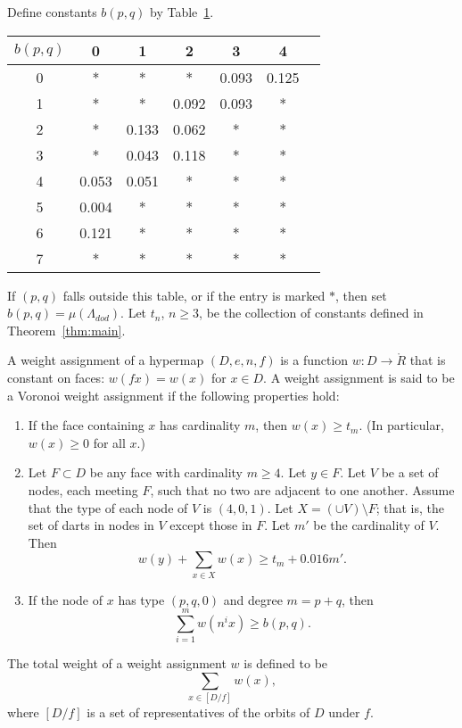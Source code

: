 \documentclass{article} %
\begin{document}
Define constants $b(p,q)$ by Table~\ref{vertexTable}.
\begin{centering}
\begin{table}
\label{vertexTable}
\begin{tabular}{|c|c|c|c|c|c|c|} 
\hline
$b(p,q)$ & 0 & 1 & 2 & 3 & 4 \\
\hline
0 & * & * & * & 0.093 & 0.125  \\
1 & * & * & 0.092 & 0.093 & *  \\
2 & * & 0.133 & 0.062 & * & *  \\
3 & * & 0.043 & 0.118 & * & *  \\
4 & 0.053 & 0.051 & * & * & *  \\
5 & 0.004 & * & * & * & *  \\
6 & 0.121 & * & * & * & * \\
7 & * & * & * & * & * \\
\hline
\end{tabular}
\end{table}
\end{centering}
If $(p,q)$ falls outside this table, or if the entry is marked $*$, then
set $b(p,q)=\mu(\Lambda_{dod})$.
Let $t_n$, $n\ge3$, be the collection of constants defined in Theorem~\ref{thm:main}.

A weight assignment of a hypermap $(D,e,n,f)$ is a function $w:D \to \ring{R}$ that
is constant on faces: $w(f x) = w(x)$ for $x\in D$.  A weight assignment is said to be a Voronoi weight assignment
if the following properties hold:
\begin{enumerate}
\item If the face containing $x$ has cardinality $m$, then $w(x)\ge t_m$.
(In particular, $w(x)\ge0$ for all $x$.)
\item Let $F\subset D$ 
be any face with cardinality $m \ge 4$.  Let $y\in F$.
Let $V$ be a set of nodes, each meeting $F$, such
that no two are adjacent to one another.  
Assume that the type of each node of $V$ is $(4,0,1)$.
Let $X =(\cup V)\setminus F$;
that is, the set of darts in nodes in $V$ except those in $F$.
Let $m'$ be the cardinality of $V$.
Then
$$
w(y) + \sum_{x\in X} w(x) \ge t_m  +  0.016 m'.
$$
\item If the node of $x$ has type $(p,q,0)$ and degree $m=p+q$, then
  $$
  \sum_{i=1}^m w(n^i x) \ge b(p,q).
  $$
\end{enumerate}
The total weight of a weight assignment $w$ is defined to be
$$
\sum_{x\in [D/f]}  w(x),
$$
where $[D/f]$ is a set of representatives of the orbits of $D$ under $f$.
\end{document}
